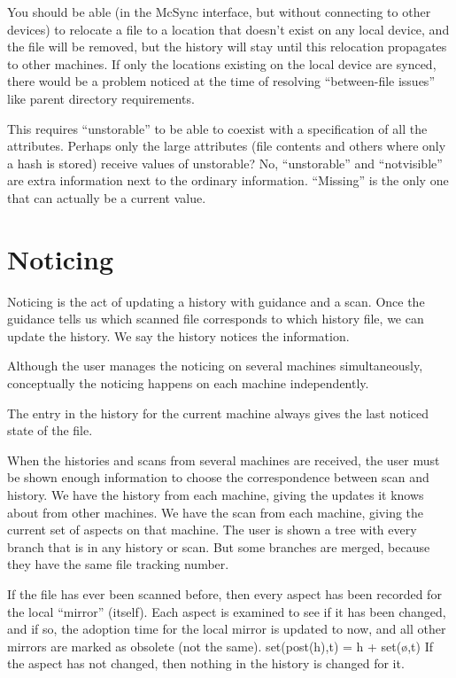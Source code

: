 \documentclass{book}
\begin{document}
You should be able (in the McSync interface, but without connecting to other devices) to relocate a file to a location that doesn't exist on any local device, and the file will be removed, but the history will stay until this relocation propagates to other machines.  If only the locations existing on the local device are synced, there would be a problem noticed at the time of resolving ``between-file issues'' like parent directory requirements.

This requires ``unstorable'' to be able to coexist with a specification of all the attributes.  Perhaps only the large attributes (file contents and others where only a hash is stored) receive values of unstorable?  No, ``unstorable'' and ``notvisible'' are extra information next to the ordinary information.  ``Missing'' is the only one that can actually be a current value.


\section{Noticing}

Noticing is the act of updating a history with guidance and a scan.
Once the guidance tells us which scanned file corresponds to which history file, we can update the history.  We say the history notices the information.

Although the user manages the noticing on several machines simultaneously, conceptually the noticing happens on each machine independently.

The entry in the history for the current machine always gives the last noticed state of the file.

When the histories and scans from several machines are received, the user must be shown enough information to choose the correspondence between scan and history.
We have the history from each machine, giving the updates it knows about from other machines.
We have the scan from each machine, giving the current set of aspects on that machine.
The user is shown a tree with every branch that is in any history or scan.  But some branches are merged, because they have the same file tracking number.

If the file has ever been scanned before, then every aspect has been recorded for the local ``mirror'' (itself).
Each aspect is examined to see if it has been changed, and if so, the adoption time for the local mirror is updated to now, and all other mirrors are marked as obsolete (not the same).  set(post(h),t) = h + set(ø,t)
If the aspect has not changed, then nothing in the history is changed for it.
\end{document}
